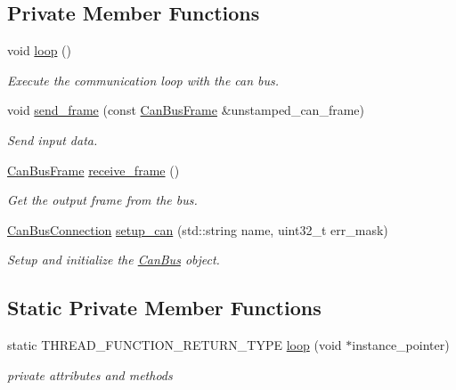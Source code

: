 \subsection*{Private Member Functions}
\begin{DoxyCompactItemize}
\item 
void \hyperlink{classblmc__drivers_1_1CanBus_a65042f6d32e30c7c367d7e5780856a60}{loop} ()\hypertarget{classblmc__drivers_1_1CanBus_a65042f6d32e30c7c367d7e5780856a60}{}\label{classblmc__drivers_1_1CanBus_a65042f6d32e30c7c367d7e5780856a60}

\begin{DoxyCompactList}\small\item\em Execute the communication loop with the can bus. \end{DoxyCompactList}\item 
void \hyperlink{classblmc__drivers_1_1CanBus_ae445662e791d0b6149289d9df39e1ea0}{send\+\_\+frame} (const \hyperlink{classblmc__drivers_1_1CanBusFrame}{Can\+Bus\+Frame} \&unstamped\+\_\+can\+\_\+frame)
\begin{DoxyCompactList}\small\item\em Send input data. \end{DoxyCompactList}\item 
\hyperlink{classblmc__drivers_1_1CanBusFrame}{Can\+Bus\+Frame} \hyperlink{classblmc__drivers_1_1CanBus_ada25ff1dcd774666f423b23d4de664ea}{receive\+\_\+frame} ()
\begin{DoxyCompactList}\small\item\em Get the output frame from the bus. \end{DoxyCompactList}\item 
\hyperlink{classblmc__drivers_1_1CanBusConnection}{Can\+Bus\+Connection} \hyperlink{classblmc__drivers_1_1CanBus_a86826b4acc0833e041e6ea02824f8d48}{setup\+\_\+can} (std\+::string name, uint32\+\_\+t err\+\_\+mask)
\begin{DoxyCompactList}\small\item\em Setup and initialize the \hyperlink{classblmc__drivers_1_1CanBus}{Can\+Bus} object. \end{DoxyCompactList}\end{DoxyCompactItemize}
\subsection*{Static Private Member Functions}
\begin{DoxyCompactItemize}
\item 
static T\+H\+R\+E\+A\+D\+\_\+\+F\+U\+N\+C\+T\+I\+O\+N\+\_\+\+R\+E\+T\+U\+R\+N\+\_\+\+T\+Y\+PE \hyperlink{classblmc__drivers_1_1CanBus_ab39625e5a1fea7d25d0967b4a48de0b4}{loop} (void $\ast$instance\+\_\+pointer)
\begin{DoxyCompactList}\small\item\em private attributes and methods \end{DoxyCompactList}\end{DoxyCompactItemize}
